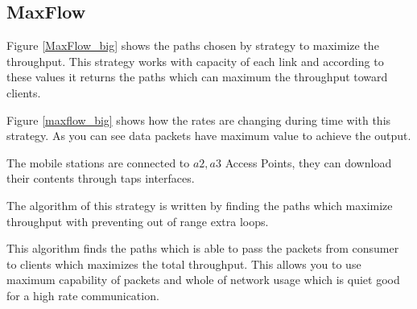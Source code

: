 











\subsection{MaxFlow}
Figure \ref{MaxFlow_big} shows the paths chosen by strategy to maximize the throughput. This strategy works with capacity of each link and according to these values it returns the paths which can maximum the throughput toward clients.

Figure \ref{maxflow_big} shows how the rates are changing during time with this strategy. As you can see data packets have maximum value to achieve the output.  

The mobile stations are connected to $a2,a3$ Access Points, they can download their contents through taps interfaces.

The algorithm of this strategy is written by finding the paths which maximize throughput with preventing out of range extra loops.

This algorithm finds the paths which is able to pass the packets from consumer to clients which maximizes the  total throughput. This allows you to use maximum capability of packets and whole of network usage which is quiet good for a high rate communication.

